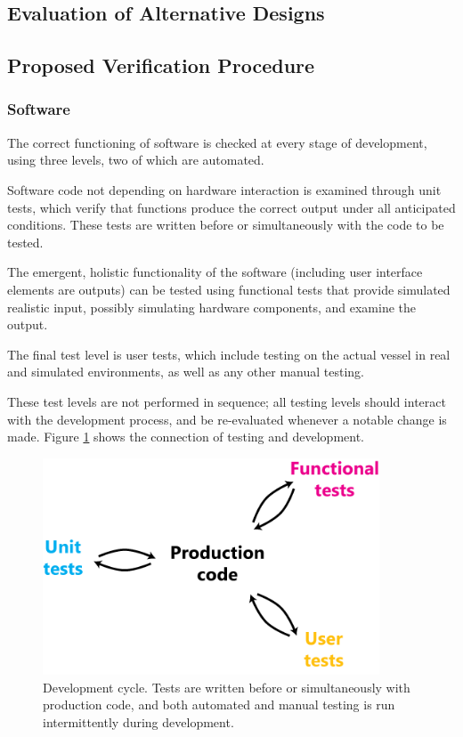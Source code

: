 \subsection{\label{sec:method:evaluation-of-alternative-designs}Evaluation of Alternative Designs}

\subsection{\label{sec:method:proposed-verification-procedure}Proposed Verification Procedure}

\subsubsection{\label{sec:method:proposed-verification-procedure:software}Software}
The correct functioning of software is checked at every stage of development, using three levels, two of which are automated.

Software code not depending on hardware interaction is examined through unit tests, which verify that functions produce the correct output under all anticipated conditions. These tests are written before or simultaneously with the code to be tested.

The emergent, holistic functionality of the software (including user interface elements are outputs) can be tested using functional tests that provide simulated realistic input, possibly simulating hardware components, and examine the output.

The final test level is user tests, which include testing on the actual vessel in real and simulated environments, as well as any other manual testing.

These test levels are not performed in sequence; all testing levels should interact with the development process, and be re-evaluated whenever a notable change is made. Figure \ref{fig:software-testing} shows the connection of testing and development.

\begin{figure}
\includegraphics[width=100mm,natwidth=494,natheight=299]{"./image/software-testing"}
\caption[Software development cycle]{\label{fig:software-testing}Development cycle. Tests are written before or simultaneously with production code, and both automated and manual testing is run intermittently during development.}
\end{figure}

